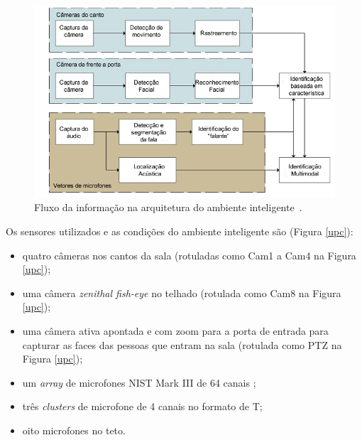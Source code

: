 	\begin{figure}[hbt]
		\begin{center}
			\includegraphics[scale=0.5]{figuras/3.TrabalhosCorrelatos/workflow.png}
		\end{center}
		\caption{Fluxo da informação na arquitetura do ambiente inteligente~\cite{salah}.}
		\label{workflow}
	\end{figure}

Os sensores utilizados e as condições do ambiente inteligente são (Figura \ref{upc}):

	\begin{itemize}
		\item quatro câmeras nos cantos da sala (rotuladas como Cam1 a Cam4 na Figura \ref{upc});
		\item uma câmera \textit{zenithal fish-eye} no telhado (rotulada como Cam8 na Figura \ref{upc});
		\item uma câmera ativa apontada e com zoom para a porta de entrada para capturar as faces das pessoas que entram na sala (rotulada como PTZ na Figura \ref{upc});
		\item um \textit{array} de microfones NIST Mark III de 64 canais ;
		\item três \textit{clusters} de microfone de 4 canais no formato de T;
		\item oito microfones no teto.
	\end{itemize}

